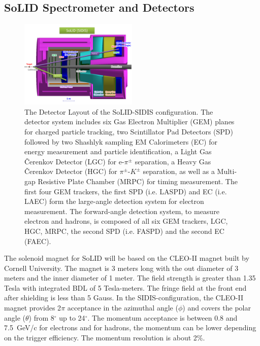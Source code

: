 \subsection {SoLID Spectrometer and Detectors} 
\begin{figure}[!ht]
 \begin{center}
  \includegraphics[width=0.5\textwidth]{./figures/SoLID_SIDIS_setup.pdf}
   \caption[The Detector Layout of the SoLID-SIDIS
     configuration]{\footnotesize{The Detector Layout of the SoLID-SIDIS
       configuration. The detector system includes six Gas Electron Multiplier
       (GEM) planes for charged particle tracking, two Scintillator Pad
       Detectors (SPD) followed by two Shashlyk sampling EM Calorimeters (EC)
       for energy measurement and particle identification, a Light Gas
       \v{C}erenkov Detector (LGC) for e-$\pi^{\pm}$ separation, a Heavy Gas
       \v{C}erenkov Detector (HGC) for $\pi^{\pm}$-$K^{\pm}$ separation, as
       well as a Multi-gap Resistive Plate Chamber (MRPC) for timing
       measurement. The first four GEM trackers, the first SPD (i.e. LASPD) and
       EC (i.e. LAEC) form the large-angle detection system for electron
       measurement. The forward-angle detection system, to measure electron and
       hadrons, is composed of all six GEM trackers, LGC, HGC, MRPC, the second
       SPD (i.e. FASPD) and the second EC (FAEC).}}
   \label{solid_sidis}
 \end{center}
\end{figure}
The solenoid magnet for SoLID will be based on the CLEO-II magnet built by
Cornell University. The magnet is 3 meters long with the out diameter of 3
meters and the inner diameter of 1 meter. The field strength is greater than
1.35 Tesla with integrated BDL of 5 Tesla-meters. The fringe field at the front
end after shielding is less than 5 Gauss. In the SIDIS-configuration, the
CLEO-II magnet provides 2$\pi$ acceptance in the azimuthal angle ($\phi$) and
covers the polar angle ($\theta$) from 8$^{\circ}$ up to 24$^{\circ}$. The
momentum acceptance is between 0.8 and 7.5~GeV/c for electrons and for hadrons, 
the momentum can be lower depending on the trigger efficiency.  The momentum resolution is
about 2\%.

